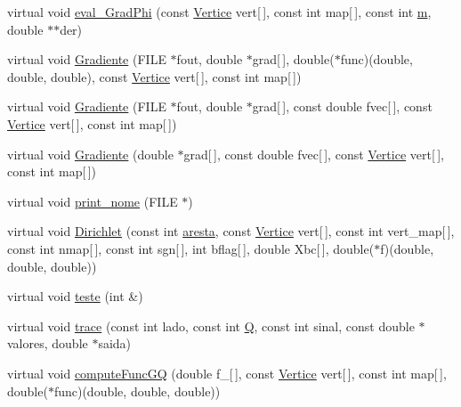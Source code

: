 \begin{DoxyCompactItemize}
\item 
virtual void \hyperlink{classTetrahedral_a6dfb6e6d44f3b5c1127e893e14a759d0}{eval\+\_\+\+Grad\+Phi} (const \hyperlink{structVertice}{Vertice} vert\mbox{[}$\,$\mbox{]}, const int map\mbox{[}$\,$\mbox{]}, const int \hyperlink{DG__EI__Header_8h_a742204794ea328ba293fe59cec79b990}{m}, double $\ast$$\ast$der)
\item 
virtual void \hyperlink{classTetrahedral_a63a3914c89069f2d6c16b1e0aaf3abce}{Gradiente} (F\+I\+LE $\ast$fout, double $\ast$grad\mbox{[}$\,$\mbox{]}, double($\ast$func)(double, double, double), const \hyperlink{structVertice}{Vertice} vert\mbox{[}$\,$\mbox{]}, const int map\mbox{[}$\,$\mbox{]})
\item 
virtual void \hyperlink{classTetrahedral_a2037c94dd0a270ae6b535a309cccb0e5}{Gradiente} (F\+I\+LE $\ast$fout, double $\ast$grad\mbox{[}$\,$\mbox{]}, const double fvec\mbox{[}$\,$\mbox{]}, const \hyperlink{structVertice}{Vertice} vert\mbox{[}$\,$\mbox{]}, const int map\mbox{[}$\,$\mbox{]})
\item 
virtual void \hyperlink{classTetrahedral_a81eab285338c6b2905505749e4e1d158}{Gradiente} (double $\ast$grad\mbox{[}$\,$\mbox{]}, const double fvec\mbox{[}$\,$\mbox{]}, const \hyperlink{structVertice}{Vertice} vert\mbox{[}$\,$\mbox{]}, const int map\mbox{[}$\,$\mbox{]})
\item 
virtual void \hyperlink{classTetrahedral_a8b37140c6823e724fc1eae1986ec69ff}{print\+\_\+nome} (F\+I\+LE $\ast$)
\item 
virtual void \hyperlink{classTetrahedral_afa5ab92fac0ada8385fddf3ddec3a8fc}{Dirichlet} (const int \hyperlink{classTetrahedral_a8b15407c8a0a1e67fb9dd5db6d8b8cff}{aresta}, const \hyperlink{structVertice}{Vertice} vert\mbox{[}$\,$\mbox{]}, const int vert\+\_\+map\mbox{[}$\,$\mbox{]}, const int nmap\mbox{[}$\,$\mbox{]}, const int sgn\mbox{[}$\,$\mbox{]}, int bflag\mbox{[}$\,$\mbox{]}, double Xbc\mbox{[}$\,$\mbox{]}, double($\ast$f)(double, double, double))
\item 
virtual void \hyperlink{classTetrahedral_acf22ee55ae8a5f17467b1dc4c6da3b51}{teste} (int \&)
\item 
virtual void \hyperlink{classTetrahedral_af069ebbab2d2cc329ff5bc26ad914e4e}{trace} (const int lado, const int \hyperlink{classStdel_a82074e598ad5af5ec45a3257a3c2b684}{Q}, const int sinal, const double $\ast$valores, double $\ast$saida)
\item 
virtual void \hyperlink{classTetrahedral_af2ec99051969b2753ec24e72b9b108f7}{compute\+Func\+GQ} (double f\+\_\+\mbox{[}$\,$\mbox{]}, const \hyperlink{structVertice}{Vertice} vert\mbox{[}$\,$\mbox{]}, const int map\mbox{[}$\,$\mbox{]}, double($\ast$func)(double, double, double))
$$
\end{DoxyCompactItemize}
